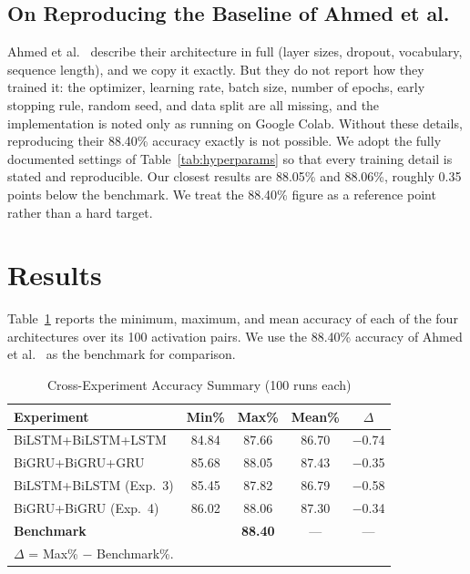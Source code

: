 \documentclass[conference]{IEEEtran}
\begin{document}
\subsection{On Reproducing the Baseline of Ahmed et al.}
\label{sec:baseline_repro}

Ahmed et al.~\cite{ahmed2025} describe their architecture in
full (layer sizes, dropout, vocabulary, sequence length), and
we copy it exactly. But they do not report how they trained
it: the optimizer, learning rate, batch size, number of
epochs, early stopping rule, random seed, and data split are
all missing, and the implementation is noted only as running on
Google Colab. Without these details, reproducing their 88.40\%
accuracy exactly is not possible. We adopt the fully documented
settings of Table~\ref{tab:hyperparams} so that every training detail is
stated and reproducible. Our closest results are 88.05\% and 88.06\%,
roughly 0.35 points below the benchmark. We treat the 88.40\%
figure as a reference point rather than a hard target.
\FloatBarrier
\section{Results}

Table~\ref{tab:sweep_summary} reports the minimum, maximum, and mean accuracy
of each of the four architectures over its 100 activation pairs.
We use the 88.40\% accuracy of Ahmed et al.~\cite{ahmed2025} as the
benchmark for comparison.

\begin{table}[htbp]
  \caption{Cross-Experiment Accuracy Summary (100 runs each)}
  \label{tab:sweep_summary}
  \centering\footnotesize
  \setlength{\tabcolsep}{3pt}
  \renewcommand{\arraystretch}{1.1}
  \begin{tabular}{lcccc}
    \toprule
    Experiment & Min\% & Max\% & Mean\% & $\Delta$ \\
    \midrule
    BiLSTM+BiLSTM+LSTM    & 84.84 & 87.66 & 86.70 & $-$0.74 \\
    BiGRU+BiGRU+GRU      & 85.68 & 88.05 & 87.43 & $-$0.35 \\
    BiLSTM+BiLSTM (Exp.~3)  & 85.45 & 87.82 & 86.79 & $-$0.58 \\
    BiGRU+BiGRU (Exp.~4)    & 86.02 & 88.06 & 87.30 & $-$0.34 \\
    \midrule
    \multicolumn{2}{l}{\textbf{Benchmark}~\cite{ahmed2025}} & \textbf{88.40} & --- & --- \\
    \bottomrule
    \multicolumn{5}{l}{$\Delta$ = Max\% $-$ Benchmark\%.}
  \end{tabular}
\end{table}
\end{document}
